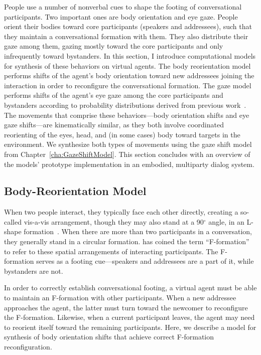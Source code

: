 People use a number of nonverbal cues to shape the footing of conversational participants. Two important ones are body orientation and eye gaze. People orient their bodies toward core participants (speakers and addressees), such that they maintain a conversational formation with them. They also distribute their gaze among them, gazing mostly toward the core participants and only infrequently toward bystanders.
In this section, I introduce computational models for synthesis of these behaviors on virtual agents.
The body reorientation model performs shifts of the agent's body orientation toward new addressees joining the interaction in order to reconfigure the conversational formation.
The gaze model performs shifts of the agent's eye gaze among the core participants and bystanders according to probability distributions derived from previous work~\citep{mutlu2012conversational}.
The movements that comprise these behaviors---body orientation shifts and eye gaze shifts---are kinematically similar, as they both involve coordinated reorienting of the eyes, head, and (in some cases) body toward targets in the environment. We synthesize both types of movements using the gaze shift model from Chapter~\ref{cha:GazeShiftModel}. This section concludes with an overview of the models' prototype implementation in an embodied, multiparty dialog system.

\subsection{Body-Reorientation Model}

When two people interact, they typically face each other directly, creating a so-called vis-a-vis arrangement, though they may also stand at a 90$^\circ$ angle, in an L-shape formation~\citep{kendon1990conducting}. When there are more than two participants in a conversation, they generally stand in a circular formation. \citet{kendon1990conducting} has coined the term ``F-formation'' to refer to these spatial arrangements of interacting participants. The F-formation serves as a footing cue---speakers and addressees are a part of it, while bystanders are not.

In order to correctly establish conversational footing, a virtual agent must be able to maintain an F-formation with other participants. When a new addressee approaches the agent, the latter must turn toward the newcomer to reconfigure the F-formation. Likewise, when a current participant leaves, the agent may need to reorient itself toward the remaining participants. Here, we describe a model for synthesis of body orientation shifts that achieve correct F-formation reconfiguration.

